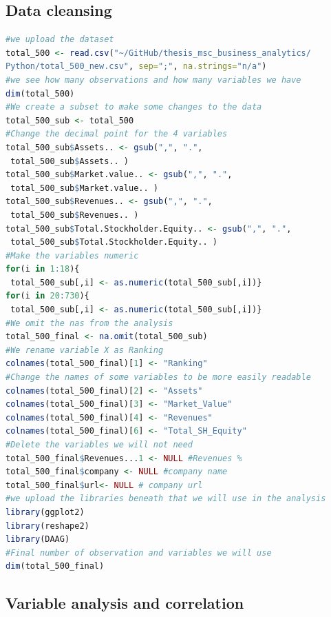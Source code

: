 \documentclass{book}
\begin{document}
\subsection{Data cleansing}\label{r:data cleansing}
\begin{lstlisting}[language=R]
#we upload the dataset
total_500 <- read.csv("~/GitHub/thesis_msc_business_analytics/
Python/total_500_new.csv", sep=";", na.strings="n/a")
#we see how many observations and how many variables we have
dim(total_500)
#We create a subset to make some changes to the data
total_500_sub <- total_500
#Change the decimal point for the 4 variables
total_500_sub$Assets.. <- gsub(",", ".",
 total_500_sub$Assets.. )
total_500_sub$Market.value.. <- gsub(",", ".",
 total_500_sub$Market.value.. )
total_500_sub$Revenues.. <- gsub(",", ".",
 total_500_sub$Revenues.. )
total_500_sub$Total.Stockholder.Equity.. <- gsub(",", ".",
 total_500_sub$Total.Stockholder.Equity.. )
#Make the variables numeric
for(i in 1:18){
 total_500_sub[,i] <- as.numeric(total_500_sub[,i])}  
for(i in 20:730){
 total_500_sub[,i] <- as.numeric(total_500_sub[,i])} 
#We omit the nas from the analysis
total_500_final <- na.omit(total_500_sub)
#We rename variable X as Ranking
colnames(total_500_final)[1] <- "Ranking"
#Change the names of some variables to be more easily readable
colnames(total_500_final)[2] <- "Assets"
colnames(total_500_final)[3] <- "Market_Value"
colnames(total_500_final)[4] <- "Revenues"
colnames(total_500_final)[6] <- "Total_SH_Equity"
#Delete the variables we will not need
total_500_final$Revenues...1 <- NULL #Revenues %
total_500_final$company <- NULL #company name
total_500_final$url<- NULL # company url
#we upload the libraries beneath that we will use in the analysis
library(ggplot2)
library(reshape2)
library(DAAG)
#Final number of observation and variables we will use
dim(total_500_final)
\end{lstlisting}

\subsection{Variable analysis and correlation}
\end{document}
